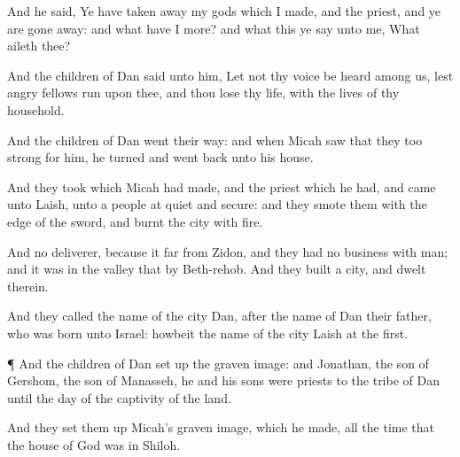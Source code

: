 {And he
said, Ye have taken
away my
gods which I
made, and the
priest, and ye are gone
away: and what have I more? and what
{} this
{} ye
say unto me, What aileth thee?

And the
children of
Dan
said unto him, Let not thy
voice be
heard among us, lest
angry
fellows
run upon thee, and thou
lose thy
life, with the
lives of thy
household.

And the
children of
Dan
went their
way: and when
Micah
saw that they
{} too
strong for him, he
turned and went
back unto his
house.


\par }{\PP {}And they
took
{} which
Micah had
made, and the
priest which he had, and
came unto
Laish, unto a
people
{} at
quiet and
secure: and they
smote them with the
edge of the
sword, and
burnt the
city with
fire.

And
{} no
deliverer, because it
{}
far from
Zidon, and they had no
business with
{}
man; and it was in the
valley that
{} by
Beth-rehob. And they
built a
city, and
dwelt therein.

And they
called the
name of the
city
Dan, after the
name of
Dan their
father, who was
born unto
Israel:
howbeit the
name of the
city
{}
Laish at the
first.


\par }{\PP {}¶ And the
children of
Dan set
up the graven
image: and
Jonathan, the
son of
Gershom, the
son of
Manasseh, he and his
sons were
priests to the
tribe of
Dan until the
day of the
captivity of the
land.

And they set them
up
Micah’s graven
image, which he
made, all the
time that the
house of
God was in
Shiloh.




\par }
